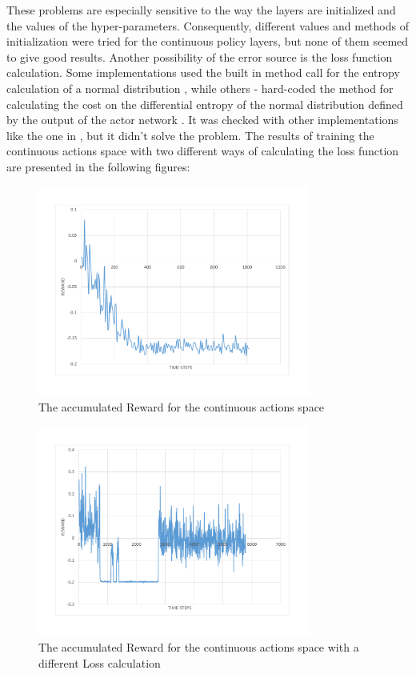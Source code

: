 These problems are especially sensitive to the way the layers are initialized and the values of the hyper-parameters. Consequently, different values and methods of initialization were tried for the continuous policy layers, but none of them seemed to give good results. Another possibility of the error source is the loss function calculation. Some implementations used the built in method call for the entropy calculation of a normal distribution \cite{A3CImplementation}, while others - hard-coded the method for calculating the cost on the differential entropy of the normal distribution defined by the output of the actor network \cite{DBLP:journals/corr/MnihBMGLHSK16}. It was checked with other implementations like the one in \cite{A3CLoss}, but it didn't solve the problem. The results of training the continuous actions space with two different ways of calculating the loss function are presented in the following figures:
\begin{figure}[H]
	\centering
	\includegraphics[width=0.8\textwidth]{Figures/ContinuousLoss1}
	\caption{The accumulated Reward for the continuous actions space}
	\label{fig:ContinuousLoss1}
\end{figure}
\begin{figure}[H]
	\centering
	\includegraphics[width=0.8\textwidth]{Figures/ContinuousLoss2}
	\caption{The accumulated Reward for the continuous actions space with a different Loss calculation}
	\label{fig:ContinuousLoss2}
\end{figure}

